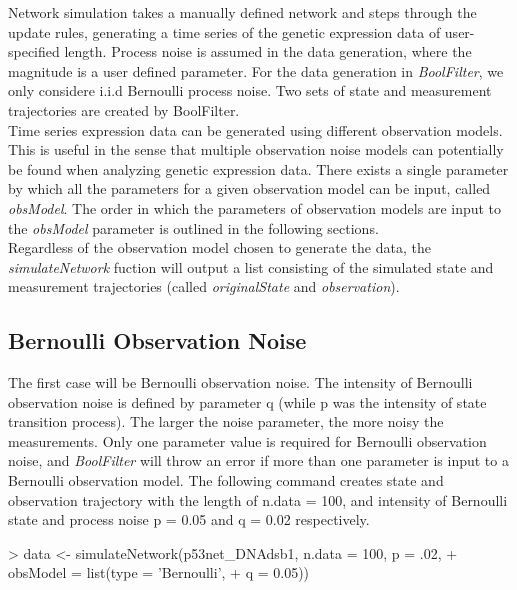 \documentclass[a4paper]{article}
\theoremstyle{plain}
\theoremstyle{definition}
\theoremstyle{remark}
\begin{document}
Network simulation takes a manually defined network and steps through the update rules, generating a time series of the genetic expression data of user-specified length. Process noise is assumed in the data generation, where the magnitude is a user defined parameter. For the data generation in \textit{BoolFilter}, we only considere i.i.d Bernoulli process noise. Two sets of state and measurement trajectories are created by BoolFilter.  
\\[1em]
Time series expression data can be generated using different observation models. This is useful in the sense that multiple observation noise models can potentially be found when analyzing genetic expression data. There exists a single parameter by which all the parameters for a given observation model can be input, called \textit{obsModel}. The order in which the parameters of observation models are input to the \textit{obsModel} parameter is outlined in the following sections. 
\\[1em]
Regardless of the observation model chosen to generate the data, the \textit{simulateNetwork} fuction will output a list consisting of the simulated state and measurement trajectories (called \textit{originalState} and \textit{observation}). 

\subsection{Bernoulli Observation Noise}

The first case will be Bernoulli observation noise. The intensity of Bernoulli observation noise is defined by parameter q (while p was the intensity of state transition process). The larger the noise parameter, the more noisy the measurements. Only one parameter value is required for Bernoulli observation noise, and \textit{BoolFilter} will throw an error if more than one parameter is input to a Bernoulli observation model. The following command creates state and observation trajectory with the length of n.data = 100, and intensity of Bernoulli state and process noise p = 0.05 and q = 0.02 respectively.

\begin{Schunk}
\begin{Sinput}
> data <- simulateNetwork(p53net_DNAdsb1, n.data = 100, p = .02,
+                       obsModel = list(type = 'Bernoulli', 
+                                       q = 0.05))
\end{Sinput}
\end{Schunk}
\end{document}
